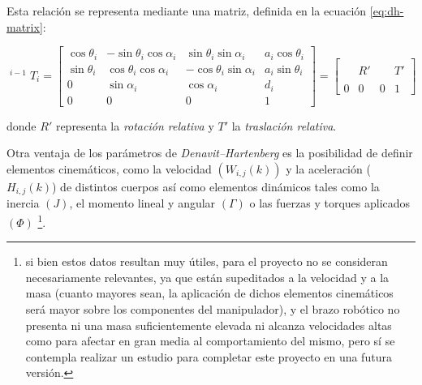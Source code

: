 Esta relación se representa mediante una matriz, definida en la ecuación \ref{eq:dh-matrix}:

\begin{equation}
    \label{eq:dh-matrix}
    {
    \displaystyle \operatorname {}
    ^{i-1}T_{i}=\left[{
                \begin{array}{ccc|c}
                    \cos{\theta_{i}} & -\sin{\theta_{i}}\cos{\alpha_{i}} & \sin{\theta_{i}}\sin{\alpha_{i}}  & a_{i}\cos{\theta_{i}} \\
                    \sin{\theta_{i}} & \cos{\theta_{i}}\cos{\alpha_{i}}  & -\cos{\theta_{i}}\sin{\alpha_{i}} & a_{i}\sin{\theta_{i}} \\
                    0                & \sin{\alpha_{i}}                  & \cos{\alpha_{i}}                  & d_{i}                 \\
                    \hline
                    0                & 0                                 & 0                                 & 1
                \end{array}}\right] =
    \left[{
                \begin{array}{ccc|c}
                      &   &   &   \\
                      & R' &   & T' \\
                      &   &   &   \\
                    \hline
                    0 & 0 & 0 & 1
                \end{array}}
        \right]
    }
\end{equation}

donde $R'$ representa la \textit{rotación relativa} y $T'$ la \textit{traslación relativa}.

Otra ventaja de los parámetros de \textit{Denavit--Hartenberg} es la posibilidad de
definir elementos cinemáticos\footnotemark[2], como la velocidad $\left(W_{i,j}(k)\right)$ y la aceleración ($H_{i,j}(k)$)
de distintos cuerpos así como elementos dinámicos tales como la inercia $\left(J\right)$,
el momento lineal y angular $\left(\Gamma\right)$ o las fuerzas y torques aplicados
$\left(\Phi\right)$ \footnote{si bien estos datos resultan muy útiles, para el proyecto no se consideran
    necesariamente relevantes, ya que están supeditados a la velocidad y a la masa (cuanto mayores sean,
    la aplicación de dichos elementos cinemáticos será mayor sobre los componentes del
    manipulador), y el brazo robótico no presenta ni una masa suficientemente elevada ni alcanza velocidades altas
    como para afectar en gran media al comportamiento del mismo, pero sí se contempla realizar un estudio para completar
    este proyecto en una futura versión.}.

